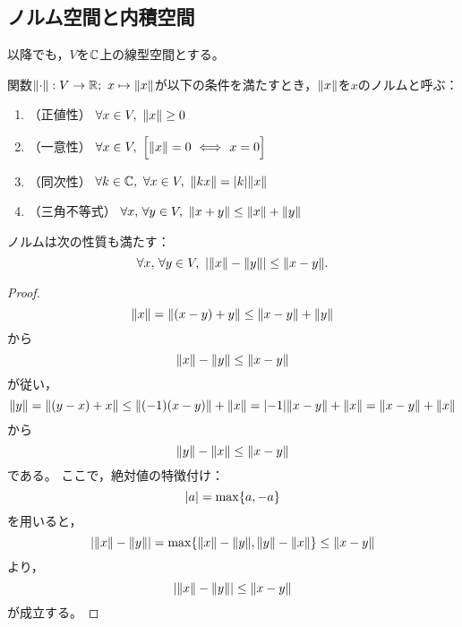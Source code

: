 \documentclass[a4paper,draft]{ltjsarticle}
\begin{document}
\subsection{ノルム空間と内積空間}
以降でも，$V$を$\mathbb{C}$上の線型空間とする。

\begin{defi}[ノルム]
    関数$\norm{\cdot}:V\to\R;\ x\mapsto \norm{x}$が以下の条件を満たすとき，$\norm{x}$を$x$のノルムと呼ぶ：
    \begin{enumerate}[label=(\roman*)]
        \item （正値性） $\forall x\in V,\ \norm{x}\geq 0$
        \item （一意性） $\forall x\in V,\ \bsqu{\norm{x}=0\ \Longleftrightarrow\ x=0}$
        \item （同次性） $\forall k\in \CC,\ \forall x\in V,\ \norm{kx}=\abs{k}\norm{x}$
        \item （三角不等式） $\forall x,\, \forall y\in V,\ \norm{x+y}\leq \norm{x}+\norm{y}$
    \end{enumerate}
\end{defi}

\begin{prop}[三角不等式]\label{prop:hermite-三角不等式}
    ノルムは次の性質も満たす：
    \begin{equation}
        \forall x,\, \forall y\in V,\ \abs{\norm{x}-\norm{y}}\leq \norm{x-y}.
    \end{equation}
    \begin{proof}
        \begin{equation}
            \norm{x}=\norm{\pare{x-y}+y}\leq \norm{x-y}+\norm{y}
        \end{equation}
        から
        \begin{equation}
            \norm{x}-\norm{y}\leq \norm{x-y}
        \end{equation}
        が従い，
        \begin{equation}
            \norm{y}=\norm{\pare{y-x}+x}\leq \norm{\pare{-1}\pare{x-y}}+\norm{x}=\abs{-1}\norm{x-y}+\norm{x}=\norm{x-y}+\norm{x}
        \end{equation}
        から
        \begin{equation}
            \norm{y}-\norm{x}\leq \norm{x-y}
        \end{equation}
        である。
        ここで，絶対値の特徴付け：
        \begin{equation}
            \abs{a}= \max\bra{a,-a}
        \end{equation}
        を用いると，
        \begin{equation}
            \abs{\norm{x}-\norm{y}}= \max\bra{\norm{x}-\norm{y},\norm{y}-\norm{x}}\leq \norm{x-y}
        \end{equation}
        より，
        \begin{equation}
            \abs{\norm{x}-\norm{y}}\leq \norm{x-y}
        \end{equation}
        が成立する。
    \end{proof}
\end{prop}
\end{document}
